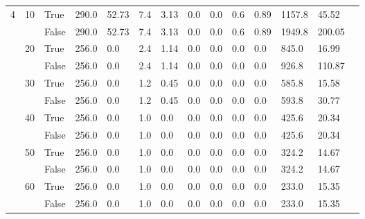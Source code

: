 \begin{landscape}
\begin{small}
\begin{longtable}[c]{@{}lll|ll|ll|ll|ll|lll@{}}
  \midrule
4  & 10 & True  & 290.0           & 52.73          & 7.4           & 3.13          & 0.0           & 0.0           & 0.6           & 0.89          & 1157.8        & 45.52       &  \\
   &    & False & 290.0           & 52.73          & 7.4           & 3.13          & 0.0           & 0.0           & 0.6           & 0.89          & 1949.8        & 200.05      &  \\
   & 20 & True  & 256.0           & 0.0            & 2.4           & 1.14          & 0.0           & 0.0           & 0.0           & 0.0           & 845.0         & 16.99       &  \\
   &    & False & 256.0           & 0.0            & 2.4           & 1.14          & 0.0           & 0.0           & 0.0           & 0.0           & 926.8         & 110.87      &  \\
   & 30 & True  & 256.0           & 0.0            & 1.2           & 0.45          & 0.0           & 0.0           & 0.0           & 0.0           & 585.8         & 15.58       &  \\
   &    & False & 256.0           & 0.0            & 1.2           & 0.45          & 0.0           & 0.0           & 0.0           & 0.0           & 593.8         & 30.77       &  \\
   & 40 & True  & 256.0           & 0.0            & 1.0           & 0.0           & 0.0           & 0.0           & 0.0           & 0.0           & 425.6         & 20.34       &  \\
   &    & False & 256.0           & 0.0            & 1.0           & 0.0           & 0.0           & 0.0           & 0.0           & 0.0           & 425.6         & 20.34       &  \\
   & 50 & True  & 256.0           & 0.0            & 1.0           & 0.0           & 0.0           & 0.0           & 0.0           & 0.0           & 324.2         & 14.67       &  \\
   &    & False & 256.0           & 0.0            & 1.0           & 0.0           & 0.0           & 0.0           & 0.0           & 0.0           & 324.2         & 14.67       &  \\
   & 60 & True  & 256.0           & 0.0            & 1.0           & 0.0           & 0.0           & 0.0           & 0.0           & 0.0           & 233.0         & 15.35       &  \\
   &    & False & 256.0           & 0.0            & 1.0           & 0.0           & 0.0           & 0.0           & 0.0           & 0.0           & 233.0         & 15.35       &  \\

\end{longtable}
\end{small}
\end{landscape}
